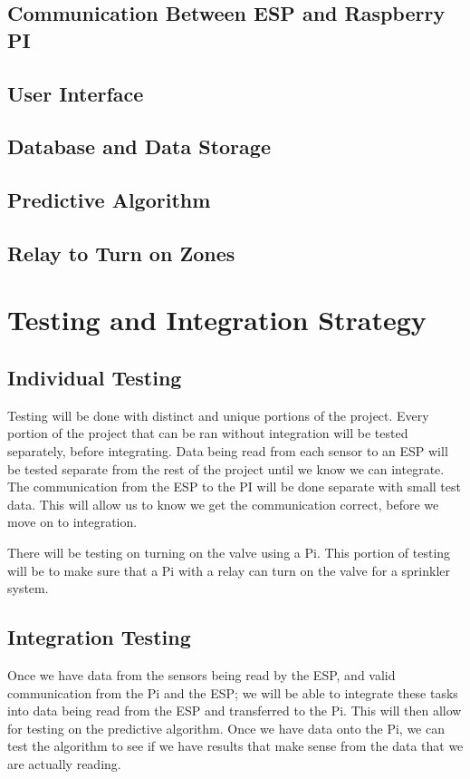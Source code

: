 \documentclass[letterpaper, 10 pt, conference]{ieeeconf}  %
\begin{document}
\subsection{Communication Between ESP and Raspberry PI}

\subsection{User Interface}

\subsection{Database and Data Storage}

\subsection{Predictive Algorithm}

\subsection{Relay to Turn on Zones}

\section{Testing and Integration Strategy}
\subsection{Individual Testing}
Testing will be done with distinct and unique portions of the project. Every portion of the project that can be ran without integration will be tested separately, before integrating. Data being read from each sensor to an ESP will be tested separate from the rest of the project until we know we can integrate. The communication from the ESP to the PI will be done separate with small test data. This will allow us to know we get the communication correct, before we move on to integration. 

There will be testing on turning on the valve using a Pi. This portion of testing will be to make sure that a Pi with a relay can turn on the valve for a sprinkler system. 

\subsection{Integration Testing}
Once we have data from the sensors being read by the ESP, and valid communication from the Pi and the ESP; we will be able to integrate these tasks into data being read from the ESP and transferred to the Pi. This will then allow for testing on the predictive algorithm. Once we have data onto the Pi, we can test the algorithm to see if we have results that make sense from the data that we are actually reading. 
\end{document}
